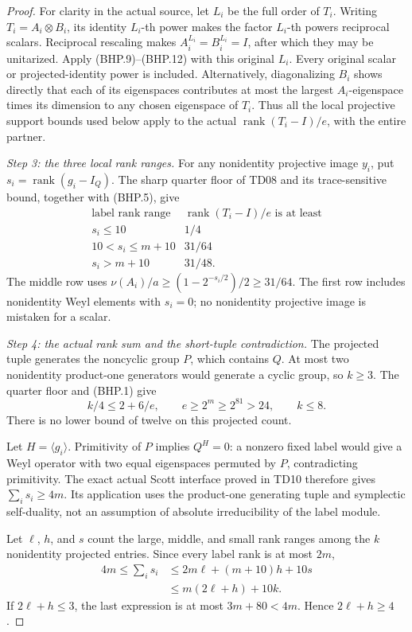 \begin{proof}
For clarity in the actual source, let \(L_i\) be the full order of
\(T_i\).  Writing \(T_i=A_i\otimes B_i\), its identity \(L_i\)-th power
makes the factor \(L_i\)-th powers reciprocal scalars.  Reciprocal
rescaling makes \(A_i^{L_i}=B_i^{L_i}=I\), after which they may be
unitarized.  Apply (BHP.9)--(BHP.12) with this original \(L_i\).
Every original scalar or projected-identity power is included.
Alternatively, diagonalizing \(B_i\) shows directly that each of its
eigenspaces contributes at most the largest \(A_i\)-eigenspace times
its dimension to any chosen eigenspace of \(T_i\).
Thus all the local projective support bounds used below apply to
the actual \(\operatorname{rank}(T_i-I)/e\), with the entire partner.

\emph{Step 3: the three local rank ranges.}
For any nonidentity projective image \(y_i\), put
\(s_i=\operatorname{rank}(g_i-I_Q)\).
The sharp quarter floor of TD08 and its trace-sensitive bound,
together with (BHP.5), give
\[
 \begin{array}{c|c}
 \text{label rank range}&
 \operatorname{rank}(T_i-I)/e\text{ is at least}\\ \hline
 s_i\le10&1/4\\
 10<s_i\le m+10&31/64\\
 s_i>m+10&31/48.
 \end{array}
 \tag{BHP.13}
\]
The middle row uses
\(\nu(A_i)/a\ge(1-2^{-s_i/2})/2\ge31/64\).
The first row includes nonidentity Weyl elements with \(s_i=0\);
no nonidentity projective image is mistaken for a scalar.

\emph{Step 4: the actual rank sum and the short-tuple contradiction.}
The projected tuple generates the noncyclic group \(P\), which
contains \(Q\).  At most two nonidentity product-one generators
would generate a cyclic group, so \(k\ge3\).
The quarter floor and (BHP.1) give
\[
                 k/4\le2+6/e,\qquad
                 e\ge2^m\ge2^{81}>24,
                 \qquad k\le8.
 \tag{BHP.14}
\]
There is no lower bound of twelve on this projected count.

Let \(H=\langle g_i\rangle\).  Primitivity of \(P\) implies \(Q^H=0\):
a nonzero fixed label would give a Weyl operator with two equal
eigenspaces permuted by \(P\), contradicting primitivity.
The exact actual Scott interface proved in TD10 therefore gives
\(\sum_i s_i\ge4m\).  Its application uses the product-one generating
tuple and symplectic self-duality, not an assumption of absolute
irreducibility of the label module.

Let \(\ell\), \(h\), and \(s\) count the large, middle, and small
rank ranges among the \(k\) nonidentity projected entries.
Since every label rank is at most \(2m\),
\[
 \begin{split}
 4m\le\sum_i s_i
 &\le2m\ell+(m+10)h+10s\\
 &\le m(2\ell+h)+10k.
 \end{split}
 \tag{BHP.15}
\]
If \(2\ell+h\le3\), the last expression is at most \(3m+80<4m\).
Hence \(2\ell+h\ge4\).


\end{proof}

